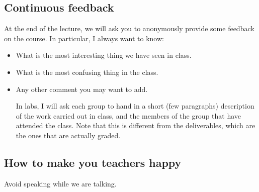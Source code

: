 \subsection{Continuous feedback}
At the end of the lecture, we will ask you to anonymously provide some feedback on the course. 
In particular, I always want to know:
\begin{itemize}
\item What is the most interesting thing we have seen in class.
\item What is the most confusing thing in the class.
\item Any other comment you may want to add.

In labs, I will ask each group to hand in a short (few paragraphs) description of the work carried out in class, and the members of the group that have attended the class.
Note that this is different from the deliverables, which are the ones that are actually graded.
\end{itemize}

\subsection{How to make you teachers happy}

Avoid speaking while we are talking.
